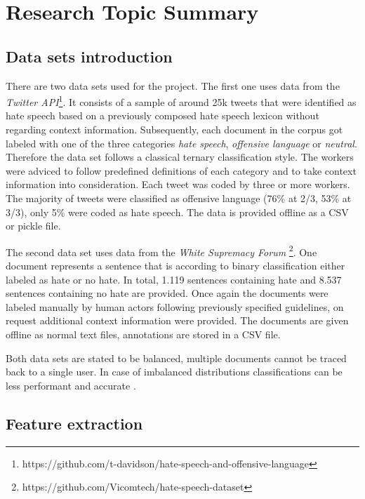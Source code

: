 \section{Research Topic Summary}

\subsection{Data sets introduction}

There are two data sets used for the project. The first one \cite{ThomasDavidson.2020} uses data from the \textit{Twitter API}\footnote{https://github.com/t-davidson/hate-speech-and-offensive-language}. It consists of a sample of around 25k tweets that were identified as hate speech based on a previously composed hate speech lexicon without regarding context information. Subsequently, each document in the corpus got labeled with one of the three categories \textit{hate speech}, \textit{offensive language} or \textit{neutral}. Therefore the data set follows a classical ternary classification style. The workers were adviced to follow predefined definitions of each category and to take context information into consideration. Each tweet was coded by three or more workers. The majority of tweets were classified as offensive language (76\% at 2/3, 53\% at 3/3), only 5\% were coded as hate speech. The data is provided offline as a CSV or pickle file. 

\noindent
The second data set uses data from the \textit{White Supremacy Forum} \cite{OnadeGibert.2020}\footnote{https://github.com/Vicomtech/hate-speech-dataset}. One document represents a sentence that is according to binary classification either labeled as hate or no hate. In total, 1.119 sentences containing hate and 8.537 sentences containing no hate are provided. Once again the documents were labeled manually by human actors following previously specified guidelines, on request additional context information were provided. The documents are given offline as normal text files, annotations are stored in a CSV file. 

\noindent
Both data sets are stated to be balanced, multiple documents cannot be traced back to a single user. In case of imbalanced distributions classifications can be less performant and accurate \cite{Oriola.2020}.

\subsection{Feature extraction}


